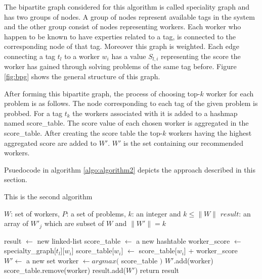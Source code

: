 \documentclass{template}
\begin{document}
The bipartite graph considered for this algorithm is called speciality graph and
has two groups of nodes. A group of nodes represent available tags in the system
and the other group consist of nodes representing workers. Each worker
who happen to be known to have experties related to a tag, is connected to the corresponding node of that
tag. Moreover this graph is weighted. Each edge connecting a tag \(t_l\) 
to a worker \(w_i\) has a value \(S_{l,i}\) representing the score the worker has gained through 
solving problems of the same tag before. Figure \ref{fig:bpg} shows the general structure of this
graph.

After forming this bipartite graph, the process of choosing top-\(k\) worker for each problem is as follows.
The node corresponding to each tag of the given problem is probbed. For a tag \(t_k\) the workers associated with it is added to a hashmap named score\_table. 
The score value of each chosen worker is aggregated in the score\_table. After creating the score table
the top-\(k\) workers having the highest aggregated score are added to \(W'\). \(W'\) is the set containing
our recommended workers.

Psuedocode in algorithm \ref{algo:algorithm2} depicts the approach described in this section.

\begin{algorithm}
    \caption{This is the second algorithm}
    \label{algo:algorithm2}
    \begin{algorithmic}[1]
        \REQUIRE 
        \(W\): set of workers, \(P\): a set of problems,
        \(k\): an integer and \(k \le \lVert W \rVert\)
        \ENSURE 
        \(result\): an array of \(W'_j\) which are subset of \(W\) and \(\lVert W'\rVert = k\)
        
        \STATE result \(\leftarrow\) new linked-list
            \STATE score\_table \(\leftarrow\) a new hashtable
                    \STATE worker\_score \(\leftarrow\) specialty\_graph[\(t_l\)][\(w_i\)]
                    \STATE score\_table[\(w_i\)] \(\leftarrow\) score\_table[\(w_i\)] + worker\_score
                \ENDFOR
            \ENDFOR
            \(W' \leftarrow \) a new set
                \STATE worker \(\leftarrow argmax(\) score\_table \()\)
                \STATE \(W'\).add(worker)
                \STATE score\_table.remove(worker)
            \ENDFOR
            \STATE result.add(\(W'\))
        \ENDFOR
        \STATE return result
    \end{algorithmic}
\end{algorithm}
\end{document}
